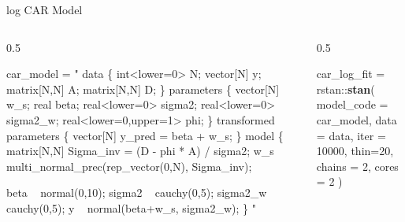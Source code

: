 \documentclass[11pt,ignorenonframetext,]{beamer}
\newenvironment{Shaded}{}{}
\newcommand{\DataTypeTok}[1]{\textcolor[rgb]{0.56,0.13,0.00}{#1}}
\newcommand{\DecValTok}[1]{\textcolor[rgb]{0.25,0.63,0.44}{#1}}
\newcommand{\KeywordTok}[1]{\textcolor[rgb]{0.00,0.44,0.13}{\textbf{#1}}}
\newcommand{\NormalTok}[1]{#1}
\newcommand{\OperatorTok}[1]{\textcolor[rgb]{0.40,0.40,0.40}{#1}}
\newcommand{\StringTok}[1]{\textcolor[rgb]{0.25,0.44,0.63}{#1}}
\def\begincol{\begin{column}}
\def\endcol{\end{column}}
\def\begincols{\begin{columns}}
\def\endcols{\end{columns}}
\let\oldShaded\Shaded
\let\endoldShaded\endShaded
\renewenvironment{Shaded}{\footnotesize\begin{spacing}{0.9}\oldShaded}{\endoldShaded\end{spacing}}
\let\oldverbatim\verbatim
\let\endoldverbatim\endverbatim
\newcommand{\tinyoutput}{
  \renewenvironment{Shaded}{\tiny\begin{spacing}{0.9}\oldShaded}{\endoldShaded\end{spacing}}
  \renewenvironment{verbatim}{\tiny\begin{spacing}{0.9}\oldverbatim}{\endoldverbatim\end{spacing}}
}
\begin{document}
\begin{frame}[fragile,t]{log CAR Model}
\protect\hypertarget{log-car-model}{}

\tinyoutput

\begincols

\begincol{0.5\textwidth}

\begin{Shaded}
\begin{Highlighting}[]
\NormalTok{car_model =}\StringTok{ "}
\StringTok{data \{}
\StringTok{  int<lower=0> N;}
\StringTok{  vector[N] y;}
\StringTok{  matrix[N,N] A;}
\StringTok{  matrix[N,N] D;}
\StringTok{\}}
\StringTok{parameters \{}
\StringTok{  vector[N] w_s;}
\StringTok{  real beta;}
\StringTok{  real<lower=0> sigma2;}
\StringTok{  real<lower=0> sigma2_w;}
\StringTok{  real<lower=0,upper=1> phi;}
\StringTok{\}}
\StringTok{transformed parameters \{}
\StringTok{  vector[N] y_pred = beta + w_s;}
\StringTok{\}}
\StringTok{model \{}
\StringTok{  matrix[N,N] Sigma_inv = (D - phi * A) / sigma2;}
\StringTok{  w_s ~ multi_normal_prec(rep_vector(0,N), Sigma_inv);}

\StringTok{  beta ~ normal(0,10);}
\StringTok{  sigma2 ~ cauchy(0,5);}
\StringTok{  sigma2_w ~ cauchy(0,5);}
\StringTok{  }
\StringTok{  y ~ normal(beta+w_s, sigma2_w);}
\StringTok{\}}
\StringTok{"}
\end{Highlighting}
\end{Shaded}

\endcol

\begincol{0.5\textwidth}

\begin{Shaded}
\end{Shaded}

\begin{Shaded}
\begin{Highlighting}[]
\NormalTok{car_log_fit =}\StringTok{ }\NormalTok{rstan}\OperatorTok{::}\KeywordTok{stan}\NormalTok{(}
  \DataTypeTok{model_code =}\NormalTok{ car_model, }\DataTypeTok{data =}\NormalTok{ data,}
  \DataTypeTok{iter =} \DecValTok{10000}\NormalTok{, }\DataTypeTok{thin=}\DecValTok{20}\NormalTok{, }\DataTypeTok{chains =} \DecValTok{2}\NormalTok{, }\DataTypeTok{cores =} \DecValTok{2}
\NormalTok{)}
\end{Highlighting}
\end{Shaded}

\endcol

\endcols

\end{frame}
\end{document}
